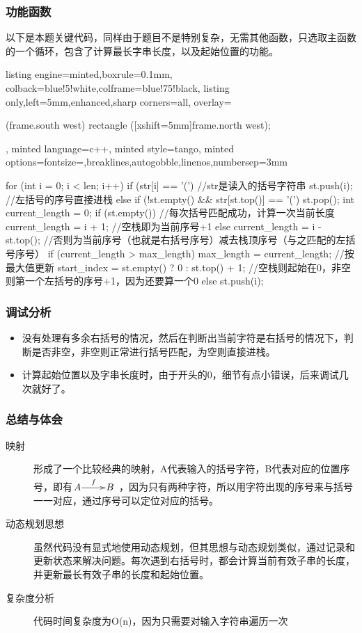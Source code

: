\documentclass[12pt]{article}
\begin{document}
\subsubsection{功能函数}
{\songti 以下是本题关键代码，同样由于题目不是特别复杂，无需其他函数，只选取主函数的一个循环，包含了计算最长字串长度，以及起始位置的功能。}
\begin{tcblisting}{listing engine=minted,boxrule=0.1mm,
colback=blue!5!white,colframe=blue!75!black,
listing only,left=5mm,enhanced,sharp corners=all,
overlay={\begin{tcbclipinterior} (frame.south west)
rectangle ([xshift=5mm]frame.north west);\end{tcbclipinterior}},
minted language=c++,
minted style=tango,
minted options={fontsize=\small,breaklines,autogobble,linenos,numbersep=3mm}}
for (int i = 0; i < len; i++) {
        if (str[i] == '(') {  //str是读入的括号字符串
            st.push(i);  //左括号的序号直接进栈
        } else {
            if (!st.empty() && str[st.top()] == '(') {
                st.pop();
                int current_length = 0;
                if (st.empty()) { //每次括号匹配成功，计算一次当前长度
                    current_length = i + 1; //空栈即为当前序号+1
                } else {
                    current_length = i - st.top(); //否则为当前序号（也就是右括号序号）减去栈顶序号（与之匹配的左括号序号）
                }
                if (current_length > max_length) {
                    max_length = current_length;  //按最大值更新
                    start_index = st.empty() ? 0 : st.top() + 1; //空栈则起始在0，非空则第一个左括号的序号+1，因为还要算一个0
                }
            } else {
                st.push(i);
            }
        }
    }
\end{tcblisting}
\subsubsection{调试分析}
\begin{itemize}
    \item 没有处理有多余右括号的情况，然后在判断出当前字符是右括号的情况下，判断是否非空，非空则正常进行括号匹配，为空则直接进栈。
    \item 计算起始位置以及字串长度时，由于开头的0，细节有点小错误，后来调试几次就好了。
\end{itemize}

\subsubsection{总结与体会}
\begin{description}
    \item[映射] 形成了一个比较经典的映射，A代表输入的括号字符，B代表对应的位置序号，即有$\xymatrix@1{A\ar[r]^{f}&B}$ ，因为只有两种字符，所以用字符出现的序号来与括号一一对应，通过序号可以定位对应的括号。
    \item[动态规划思想] 虽然代码没有显式地使用动态规划，但其思想与动态规划类似，通过记录和更新状态来解决问题。每次遇到右括号时，都会计算当前有效子串的长度，并更新最长有效子串的长度和起始位置。
    \item[复杂度分析] 代码时间复杂度为O(n)，因为只需要对输入字符串遍历一次
\end{description}
\end{document}
